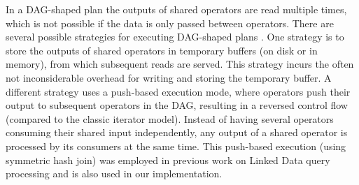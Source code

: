 In a DAG-shaped plan the outputs of shared operators are read multiple
times, which is not possible if the data is only passed between
operators. There are several possible strategies for executing
DAG-shaped plans \cite{Neumann_2005}. One strategy is to store the
outputs of shared operators in temporary buffers (on disk or in
memory), from which subsequent reads are served. This strategy incurs
the often not inconsiderable overhead for writing and storing the
temporary buffer. A different strategy uses a push-based execution
mode, where operators push their output to subsequent operators in the
DAG, resulting in a reversed control flow (compared to the classic
iterator model). Instead of having several operators consuming their
shared input independently, any output of a shared operator is
processed by its consumers at the same time. This push-based execution
(using symmetric hash join) was employed in previous work on Linked
Data query processing \cite{ladwig_linked_2010,sihjoin_2011} and is
also used in our implementation.

%  	


